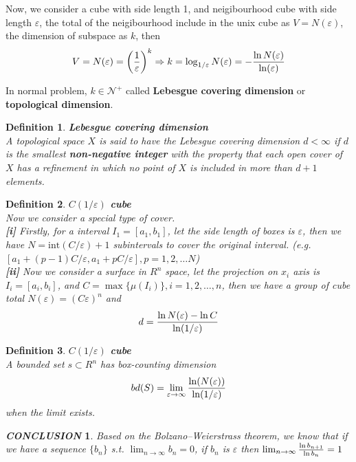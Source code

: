 \documentclass[12pt]{article}
\theoremstyle{plain}
\newtheorem{definition}{{\color{red}\textbf{Definition}}}[section]
\newtheorem{conclusion}{\textit{\textbf{CONCLUSION}}}[section]
\begin{document}
Now, we consider a cube with side length 1, and neigibourhood cube with side length $\varepsilon$, the total of the neigibourhood include in the unix cube as $V = N(\varepsilon)$, the dimension of subspace as $k$, then 
$$
V = N(\varepsilon) = \left(1 \over \varepsilon\right)^k \Rightarrow k = \log_{1/\varepsilon}N(\varepsilon) = - {\ln N(\varepsilon)\over \ln(\varepsilon)}
$$

In normal problem, $k \in \mathcal N^+$ called \textbf{Lebesgue covering dimension} or \textbf{topological dimension}.
\begin{definition}\textbf{Lebesgue covering dimension} 
\\\noindent A topological space $X$ is said to have the Lebesgue covering dimension $d < \infty$ if $d$ is the smallest \textbf{non-negative integer} with the property that each open cover of $X$ has a refinement in which no point of $X$ is included in more than $d + 1$ elements.
\end{definition}





\begin{definition}\textbf{$C(1/\varepsilon)$ cube}
\\\noindent Now we consider a special type of cover.
\\\noindent \textbf{[i]} Firstly, for a interval $I_1 = [a_1, b_1]$, let the side length of boxes is $\varepsilon$, then we have $N = \text{int}(C/\varepsilon) + 1$ subintervals to cover the original interval. (e.g. $[a_1 + (p - 1)C/\varepsilon, a_1 + pC/\varepsilon], p = 1, 2, \ldots N$)
\\\noindent \textbf{[ii]} Now we consider a surface in $R^n$ space, let the projection on $x_i$ axis is $I_i = [a_i, b_i]$, and $C = \max\{\mu(I_i)\}, i = 1, 2, \ldots, n$, then we have a group of cube total $N(\varepsilon) = (C\varepsilon)^n$ and 
$$
d = {\ln N(\varepsilon) - \ln C \over \ln(1/ \varepsilon)}
$$
\end{definition}


\begin{definition}\textbf{$C(1/\varepsilon)$ cube}
\\\noindent A bounded set $s \subset R^n$ has box-counting dimension 
$$
bd(S) = \lim_{\varepsilon \rightarrow \infty} {\ln(N(\varepsilon)) \over \ln(1 /\varepsilon)}
$$
when the limit exists.
\end{definition}

\begin{conclusion}Based on the Bolzano–Weierstrass theorem, we know that if we have a sequence $\{b_n\}$ s.t. $\lim_{n \rightarrow \infty}b_n = 0$, if $b_n$ is $\varepsilon$ then $\lim_{n \rightarrow \infty}{\ln b_{n+1} \over \ln b_n} = 1$
\end{conclusion}
\end{document}
